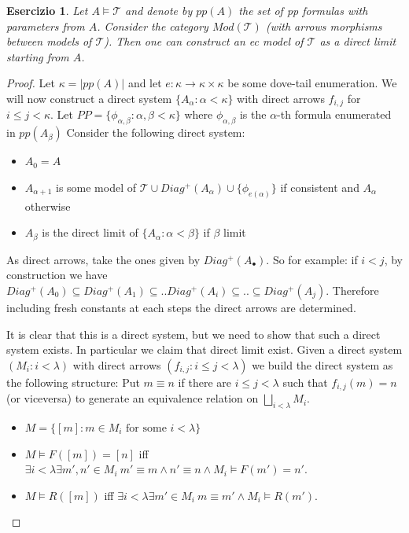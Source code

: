 \documentclass{article}
\newtheorem{exercise}{Esercizio}
\begin{document}
\begin{exercise}

	Let $A \models \mathcal{T}$ and denote by $pp(A)$ the set of pp formulas with parameters from $A$.
	Consider the category $Mod(\mathcal{T})$ (with arrows morphisms between models of $\mathcal{T}$).
	Then one can construct an ec model of $\mathcal{T}$ as a direct limit starting from $A$.

\end{exercise}

\begin{proof}

	Let $\kappa = |pp(A)|$ and let $e: \kappa \to \kappa \times \kappa$ be some dove-tail enumeration.
	We will now construct a direct system $\{A_\alpha : \alpha < \kappa \}$ with direct arrows $f_{i,j}$ for $i \leq j < \kappa$.
	Let $PP = \{\phi_{\alpha,\beta} : \alpha,\beta < \kappa \}$ where $\phi_{\alpha,\beta}$ is the $\alpha$-th formula enumerated in $pp(A_\beta)$
	Consider the following direct system:
	\begin{itemize}
		\item	$A_0 = A$
		\item	$A_{\alpha + 1}$ is some model of $\mathcal{T} \cup Diag^+(A_{\alpha}) \cup \{\phi_{e(\alpha)}\}$ if consistent and $A_{\alpha}$ otherwise
		\item	$A_{\beta}$ is the direct limit of $\{A_{\alpha} : \alpha < \beta \}$ if $\beta$ limit
	\end{itemize}
	
	As direct arrows, take the ones given by $Diag^+(A_{\bullet})$. 
	So for example: if $i < j$, by construction we have $Diag^+(A_0) \subseteq Diag^+(A_1) \subseteq .. Diag^+(A_i) \subseteq .. \subseteq Diag^+(A_j)$.
	Therefore including fresh constants at each steps the direct arrows are determined.

	It is clear that this is a direct system, but we need to show that such a direct system exists. In particular we claim that direct limit exist.
	Given a direct system $(M_i : i < \lambda)$ with direct arrows $(f_{i,j} : i \leq j < \lambda)$ we build the direct system as the following structure:
	Put $m \equiv n$ if there are $i \leq j < \lambda$ such that $f_{i,j}(m) = n$ (or viceversa) to generate an equivalence relation on $\bigsqcup_{i < \lambda} M_i$.
	\begin{itemize}
		\item	$M = \{ [m] : m \in M_i \text{ for some }i < \lambda \}$
		\item	$M \models F([m]) = [n]$ iff $\exists i < \lambda \exists m',n' \in M_i \ m' \equiv m \land n' \equiv n \land M_i \models F(m') = n'$.
		\item	$M \models R([m])$ iff $\exists i < \lambda \exists m' \in M_i \ m \equiv m' \land  M_i \models R(m')$.


\end{itemize}
\end{proof}
\end{document}
